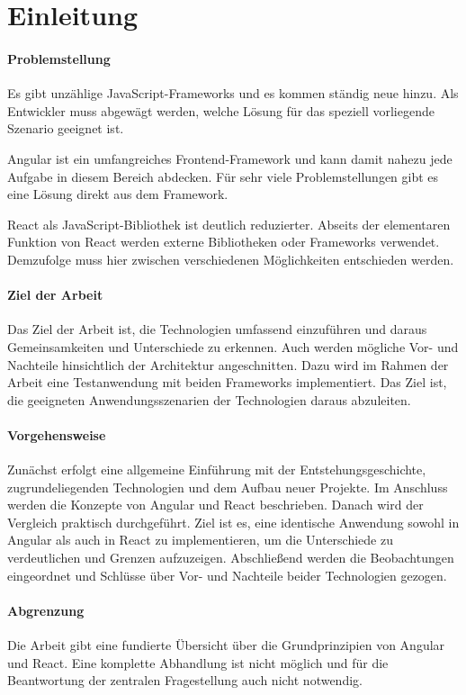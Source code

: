 \chapter{Einleitung}
\subsubsection{Problemstellung}
Es gibt unzählige JavaScript-Frameworks und es kommen ständig neue hinzu. Als Entwickler muss abgewägt werden, welche Lösung für das speziell vorliegende Szenario geeignet ist.

Angular ist ein umfangreiches Frontend-Framework und kann damit nahezu jede Aufgabe in diesem Bereich abdecken. Für sehr viele Problemstellungen gibt es eine Lösung direkt aus dem Framework. 

React als JavaScript-Bibliothek ist deutlich reduzierter. Abseits der elementaren Funktion von React werden externe Bibliotheken oder Frameworks verwendet. Demzufolge muss hier zwischen verschiedenen Möglichkeiten entschieden werden.

\subsubsection{Ziel der Arbeit}
Das Ziel der Arbeit ist, die Technologien umfassend einzuführen und daraus Gemeinsamkeiten und Unterschiede zu erkennen. Auch werden mögliche Vor- und Nachteile hinsichtlich der Architektur angeschnitten. Dazu wird im Rahmen der Arbeit eine Testanwendung mit beiden Frameworks implementiert. Das Ziel ist, die geeigneten Anwendungsszenarien der Technologien daraus abzuleiten.

\subsubsection{Vorgehensweise}
Zunächst erfolgt eine allgemeine Einführung mit der Entstehungsgeschichte, zugrundeliegenden Technologien und dem Aufbau neuer Projekte. Im Anschluss werden die Konzepte von Angular und React beschrieben. Danach wird der Vergleich praktisch durchgeführt. Ziel ist es, eine identische Anwendung sowohl in Angular
als auch in React zu implementieren, um die Unterschiede zu verdeutlichen und Grenzen aufzuzeigen. Abschließend werden die Beobachtungen eingeordnet und Schlüsse über Vor- und Nachteile beider Technologien gezogen.

\subsubsection{Abgrenzung}
Die Arbeit gibt eine fundierte Übersicht über die Grundprinzipien von Angular und React. Eine komplette Abhandlung ist nicht möglich und für die Beantwortung der zentralen Fragestellung auch nicht notwendig.

